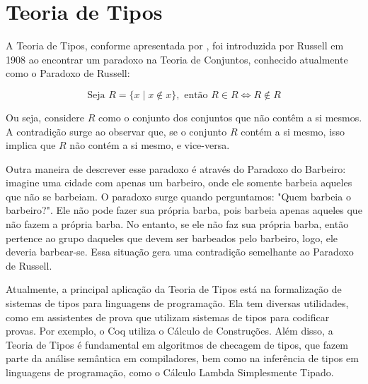 \chapter{Teoria de Tipos} \label{ch:type-theory}

A Teoria de Tipos, conforme apresentada por \cite{COQUAND2022}, foi introduzida por Russell em 1908 ao encontrar um paradoxo na Teoria de Conjuntos, conhecido atualmente como o Paradoxo de Russell:

\begin{equation} \label{eq:russell-paradox}
  \text{Seja } R = \{ x \mid x \notin x \}, \text{ então } R \in R \iff R \notin R
\end{equation}

Ou seja, considere $R$ como o conjunto dos conjuntos que não contêm a si mesmos.
A contradição surge ao observar que, se o conjunto $R$ contém a si mesmo, isso implica que $R$ não contém a si mesmo, e vice-versa.

Outra maneira de descrever esse paradoxo é através do Paradoxo do Barbeiro: imagine uma cidade com apenas um barbeiro, onde ele somente barbeia aqueles que não se barbeiam.
O paradoxo surge quando perguntamos: "Quem barbeia o barbeiro?".
Ele não pode fazer sua própria barba, pois barbeia apenas aqueles que não fazem a própria barba.
No entanto, se ele não faz sua própria barba, então pertence ao grupo daqueles que devem ser barbeados pelo barbeiro, logo, ele deveria barbear-se.
Essa situação gera uma contradição semelhante ao Paradoxo de Russell.

Atualmente, a principal aplicação da Teoria de Tipos está na formalização de sistemas de tipos para linguagens de programação.
Ela tem diversas utilidades, como em assistentes de prova que utilizam sistemas de tipos para codificar provas.
Por exemplo, o Coq \cite{COQUAND1998} utiliza o Cálculo de Construções.
Além disso, a Teoria de Tipos é fundamental em algoritmos de checagem de tipos, que fazem parte da análise semântica em compiladores, bem como na inferência de tipos em linguagens de programação, como o Cálculo Lambda Simplesmente Tipado.


